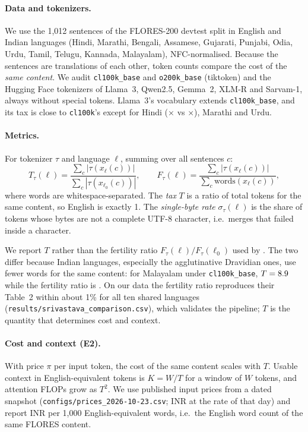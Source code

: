 \paragraph{Data and tokenizers.}
We use the 1{,}012 sentences of the FLORES-200 devtest split \citep{nllb2022} in English and \nLangs{}
Indian languages (Hindi, Marathi, Bengali, Assamese, Gujarati, Punjabi, Odia, Urdu, Tamil, Telugu,
Kannada, Malayalam), NFC-normalised. Because the sentences are translations of each other, token
counts compare the cost of the \emph{same content}. We audit \texttt{cl100k\_base} and
\texttt{o200k\_base} (tiktoken) and the Hugging Face tokenizers of Llama~3, Qwen2.5, Gemma~2, XLM-R and
Sarvam-1, always without special tokens. Llama~3's vocabulary extends \texttt{cl100k\_base}, and its
tax is close to \texttt{cl100k}'s except for Hindi (\taxLlHin$\times$ vs \taxClHin$\times$), Marathi and Urdu.

\paragraph{Metrics.}
For tokenizer $\tau$ and language $\ell$, summing over all sentences $c$:
\begin{equation*}
T_\tau(\ell)=\frac{\sum_c|\tau(x_\ell(c))|}{\sum_c|\tau(x_{\ell_0}(c))|},\qquad
F_\tau(\ell)=\frac{\sum_c|\tau(x_\ell(c))|}{\sum_c \mathrm{words}(x_\ell(c))},
\end{equation*}
where words are whitespace-separated. The \emph{tax} $T$ is a ratio of total tokens for the same content,
so English is exactly 1. The \emph{single-byte rate} $\sigma_\tau(\ell)$ is the share of tokens whose bytes
are not a complete UTF-8 character, i.e.\ merges that failed inside a character.

We report $T$ rather than the fertility ratio $F_\tau(\ell)/F_\tau(\ell_0)$ used by \citet{srivastava2026}.
The two differ because Indian languages, especially the agglutinative Dravidian ones, use fewer words for the
same content: for Malayalam under \texttt{cl100k\_base}, $T=8.9$ while the fertility ratio is
\fertratioClMal. On our data the fertility ratio reproduces their Table~2 within about 1\% for all ten shared
languages (\texttt{results/srivastava\_comparison.csv}), which validates the pipeline; $T$ is the quantity
that determines cost and context.

\paragraph{Cost and context (E2).}
With price $\pi$ per input token, the cost of the same content scales with $T$. Usable context in
English-equivalent tokens is $K=W/T$ for a window of $W$ tokens, and attention FLOPs grow as $T^2$. We use
published input prices from a dated snapshot (\texttt{configs/prices\_2026-10-23.csv}; INR at the rate of that day)
and report INR per 1{,}000 English-equivalent words, i.e.\ the English word count of the same FLORES content.


